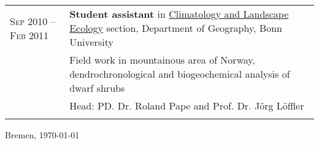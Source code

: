 \documentclass[a4paper,10pt]{article} %
\begin{document}
\begin{longtable}{R{2cm}|p{13cm}}
\textsc{Sep 2010\,\,--Feb 2011} & \textbf{Student assistant} in \href{https://www.geographie.uni-bonn.de/forschung/ags/ag-loeffler/arbeitsgruppe-loeffler}{Climatology and Landscape Ecology} section, Department of Geography, Bonn University\\
& \small{Field work in mountainous area of Norway, dendrochronological and biogeochemical analysis of dwarf shrubs}\\
& \small{Head: PD. Dr. Roland Pape and Prof. Dr. Jörg Löffler}\\
\\

\end{longtable}





\vfill
\begin{flushright}
  Bremen, \today
\end{flushright}

\newpage

\end{document}
